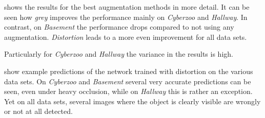  shows the results for the best augmentation methods in more detail. It can be seen how \textit{grey} improves the performance mainly on \textit{Cyberzoo} and \textit{Hallway}. In contrast, on \textit{Basement} the performance drops compared to not using any augmentation. \textit{Distortion} leads to a more even improvement for all data sets.

Particularly for \textit{Cyberzoo} and \textit{Hallway} the variance in the results is high.

 show example predictions of the network trained with distortion on the various data sets. On \textit{Cyberzoo} and \textit{Basement} several very accurate predictions can be seen, even under heavy occlusion, while on \textit{Hallway} this is rather an exception. Yet on all data sets, several images where the object is clearly visible are wrongly or not at all detected.

